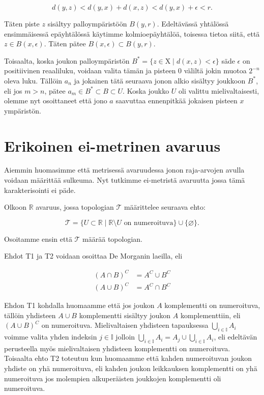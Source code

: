 \documentclass[12pt,a4paper,leqno]{report}
\newcommand{\R}{\mathbb{R}}
\newcommand{\X}{\mathrm{X}}
\newcommand{\T}{\mathcal{T}}
\theoremstyle{plain}
\theoremstyle{definition}
\theoremstyle{remark}
\begin{document}
\begin{equation}
d(y,z) < d(y,x) + d(x,z) < d(y,x) + \epsilon < r\text{.}
\end{equation}

Täten piste $z$ sisältyy palloympäristöön $B(y,r)$. Edeltävässä yhtälössä ensimmäisessä epäyhtälössä käytimme kolmioepäyhtälöä, toisessa tietoa siitä, että $z \in B(x,\epsilon)$. Täten pätee $B(x, \epsilon) \subset B(y,r)$.

Toisaalta, koska joukon palloympäristön $B^* = \{z \in \X \mid d(x,z) < \epsilon\}$ säde $\epsilon$ on positiivinen reaaliluku, voidaan valita tämän ja pisteen $0$ väliltä jokin muotoa $2^{-n}$ oleva luku. Tällöin $a_n$ ja jokainen tätä seuraava jonon alkio sisältyy joukkoon $B^*$, eli jos $m > n$, pätee $a_m \in B^* \subset B \subset U$. Koska joukko $U$ oli valittu mielivaltaisesti, olemme nyt osoittaneet että jono $a$ saavuttaa ennenpitkää jokaisen pisteen $x$ ympäristön.

\chapter{Erikoinen ei-metrinen avaruus}
Aiemmin huomasimme että metrisessä avaruudessa jonon raja-arvojen avulla voidaan määrittää sulkeuma. Nyt tutkimme ei-metristä avaruutta jossa tämä karakterisointi ei päde.

Olkoon $\R$ avaruus, jossa topologian $\T$ määrittelee seuraava ehto:

\begin{equation}
\T = \{U \subset \R \mid \R \setminus U \text{ on numeroituva} \} \cup \{ \varnothing \}\text{.}
\end{equation}

Osoitamme ensin että $\T$ määrää topologian.

Ehdot T1 ja T2 voidaan osoittaa De Morganin laeilla, eli 

\begin{align}
(A \cap B)^C &= A^C \cup B^C \\
(A \cup B)^C &= A^C \cap B^C
\end{align}

Ehdon T1 kohdalla huomaamme että jos joukon $A$ komplementti on numeroituva, tällöin yhdisteen $A \cup B$ komplementti sisältyy joukon $A$ komplementtiin, eli $(A \cup B)^C$ on numeroituva. Mielivaltaisen yhdisteen tapauksessa $\bigcup_{i \in \mathbb{I}} A_i$ voimme valita yhden indeksin $j \in \mathbb{I}$ jolloin $\bigcup_{i \in \mathbb{I}} A_i = A_j \cup\bigcup_{i \in \mathbb{I}} A_i$, eli edeltävän perusteella myös mielivaltaisen yhdisteen komplementti on numeroituva. Toisaalta ehto T2 toteutuu kun huomaamme että kahden numeroituvan joukon yhdiste on yhä numeroituva, eli kahden joukon leikkauksen komplementti on yhä numeroituva jos molempien alkuperäisten joukkojen komplementti oli numeroituva.
\end{document}
